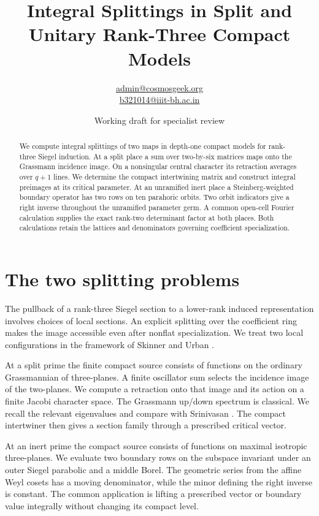 \documentclass[11pt]{article}
\title{Integral Splittings in Split and Unitary Rank-Three Compact Models}
\author{\small \href{mailto:admin@cosmosgeek.org}{admin@cosmosgeek.org}\\[-2pt]
\small\href{mailto:b321014@iiit-bh.ac.in}{b321014@iiit-bh.ac.in}}
\date{Working draft for specialist review}
\begin{document}
\maketitle
\begin{abstract}
We compute integral splittings of two maps in depth-one compact models
for rank-three Siegel induction. At a split place a sum over two-by-six
matrices maps onto the Grassmann incidence image. On a nonsingular
central character its retraction averages over $q+1$ lines. We
determine the compact intertwining matrix and construct integral
preimages at its critical parameter. At an unramified inert place a
Steinberg-weighted boundary operator has two rows on ten parahoric
orbits. Two orbit indicators give a right inverse throughout the
unramified parameter germ. A common open-cell Fourier calculation supplies the exact rank-two determinant factor at both places. Both calculations retain the lattices
and denominators governing coefficient specialization.
\end{abstract}

\section{The two splitting problems}
The pullback of a rank-three Siegel section to a lower-rank induced
representation involves choices of local sections. An explicit
splitting over the coefficient ring makes the image accessible even
after nonflat specialization. We treat two local configurations in
the framework of Skinner and Urban \cite[\S\S10--11]{SU}.

At a split prime the finite compact source consists of functions on
the ordinary Grassmannian of three-planes. A finite oscillator sum
selects the incidence image of the two-planes. We compute a retraction
onto that image and its action on a finite Jacobi character space.
The Grassmann up/down spectrum is classical. We recall the relevant
eigenvalues and compare with Srinivasan \cite{Srinivasan}. The compact
intertwiner then gives a section family through a prescribed critical
vector.

At an inert prime the compact source consists of functions on maximal
isotropic three-planes. We evaluate two boundary rows on the subspace
invariant under an outer Siegel parabolic and a middle Borel. The
geometric series from the affine Weyl cosets has a moving denominator,
while the minor defining the right inverse is constant. The common
application is lifting a prescribed vector or boundary value
integrally without changing its compact level.
\end{document}
